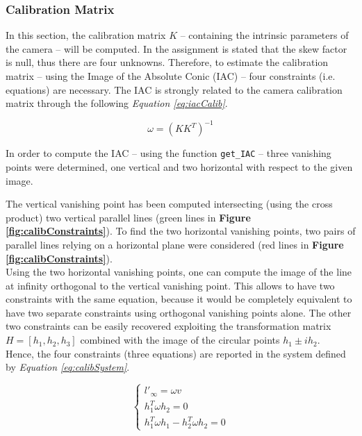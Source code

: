 \documentclass[12pt,a4paper]{article}
\begin{document}
\subsubsection{Calibration Matrix}\label{sec:toCalibrationMatrix}
In this section, the calibration matrix $K$ -- containing the intrinsic parameters of the camera --  will be computed. In the assignment is stated that the skew factor is null, thus there are four unknowns. Therefore, to estimate the calibration matrix -- using the Image of the Absolute Conic (IAC) -- four constraints (i.e. equations) are necessary. The IAC is strongly related to the camera calibration matrix through the following \textit{Equation \ref{eq:iacCalib}}.

\begin{equation}
    \omega = (KK^T)^{-1}
    \label{eq:iacCalib}
\end{equation}
\bigskip

In order to compute the IAC -- using the function \verb|get_IAC| -- three vanishing points were determined, one vertical and two horizontal with respect to the given image.

\pagebreak

The vertical vanishing point has been computed intersecting (using the cross product) two vertical parallel lines (green lines in \textbf{Figure \ref{fig:calibConstraints}}). To find the two horizontal vanishing points, two pairs of parallel lines relying on a horizontal plane were considered (red lines in \textbf{Figure \ref{fig:calibConstraints}}).\\

Using the two horizontal vanishing points, one can compute the image of the line at infinity orthogonal to the vertical vanishing point. This allows to have two constraints with the same equation, because it would be completely equivalent to have two separate constraints using orthogonal vanishing points alone. The other two constraints can be easily recovered exploiting the transformation matrix $H = [h_1,h_2,h_3]$ combined with the image of the circular points $h_1 \pm ih_2$.\\

Hence, the four constraints (three equations) are reported in the system defined by \textit{Equation \ref{eq:calibSystem}}.

\begin{equation}
    \begin{cases}
        l'_\infty = \omega v\\
        h_1^T\omega h_2 = 0\\
        h_1^T\omega h_1 - h_2^T\omega h_2 = 0
    \end{cases}
    \label{eq:calibSystem}
\end{equation}
\end{document}
